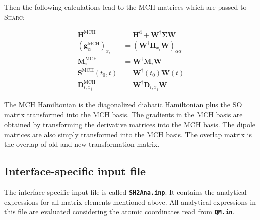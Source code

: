 \documentclass[a4paper,11pt,DIV=15,openany,twoside=false]{scrbook}
\newcommand{\tthdump}[1]{#1}
\newcommand{\sharc}{\textsc{Sharc}}
\newcommand{\ttt}[1]{\textbf{\texttt{#1}}}
\begin{document}
Then the following calculations lead to the MCH matrices which are passed to \sharc:
\tthdump{
  \begin{align}
    \mathbf{H}^{\text{MCH}}&=\mathbf{H}^{\text{d}}+\mathbf{W}^\dagger\boldsymbol{\Sigma}\mathbf{W}\\
    \left(\mathbf{g}^{\text{MCH}}_\alpha\right)_{x_i}&=\left(\mathbf{W}^\dagger\mathbf{H}_{x_i}\mathbf{W}\right)_{\alpha\alpha}\\
    \mathbf{M}^{\text{MCH}}_i&=\mathbf{W}^\dagger\mathbf{M}_i\mathbf{W}\\
    \mathbf{S}^{\text{MCH}}(t_0,t)&=\mathbf{W}^\dagger(t_0)\mathbf{W}(t)\\
    \mathbf{D}^{\text{MCH}}_{i,x_j}&=\mathbf{W}^\dagger\mathbf{D}_{i,x_j}\mathbf{W}
  \end{align}
}
The MCH Hamiltonian is the diagonalized diabatic Hamiltonian plus the SO matrix transformed into the MCH basis. The gradients in the MCH basis are obtained by transforming the derivative matrices into the MCH basis. The dipole matrices are also simply transformed into the MCH basis. The overlap matrix is the overlap of old and new transformation matrix.

\subsection{Interface-specific input file}

The interface-specific input file is called \ttt{SH2Ana.inp}. It contains the analytical expressions for all matrix elements mentioned above. All analytical expressions in this file are evaluated considering the atomic coordinates read from \ttt{QM.in}.
\end{document}
